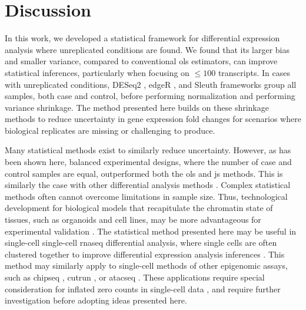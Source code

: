 \section{Discussion}

In this work, we developed a statistical framework for differential expression analysis where unreplicated conditions are found.
We found that its larger bias and smaller variance, compared to conventional \gls{ols} estimators, can improve statistical inferences, particularly when focusing on $\le 100$ transcripts.
In cases with unreplicated conditions, DESeq2 \cite{loveModeratedEstimationFold2014}, edgeR \cite{robinsonEdgeRBioconductorPackage2010}, and Sleuth \cite{pimentelDifferentialAnalysisRNAseq2017,yiGenelevelDifferentialAnalysis2018} frameworks group all samples, both case and control, before performing normalization and performing variance shrinkage.
The method presented here builds on these shrinkage methods to reduce uncertainty in gene expression fold changes for scenarios where biological replicates are missing or challenging to produce.

Many statistical methods exist to similarly reduce uncertainty.
However, as has been shown here, balanced experimental designs, where the number of case and control samples are equal, outperformed both the \gls{ols} and \gls{js} methods.
This is similarly the case with other differential analysis methods \cite{schurchHowManyBiological2016,gierlinskiStatisticalModelsRNAseq2015}.
Complex statistical methods often cannot overcome limitations in sample size.
Thus, technological development for biological models that recapitulate the chromatin state of tissues, such as organoids and cell lines, may be more advantageous for experimental validation \cite{zanoniModelingNeoplasticDisease2020}.
The statistical method presented here may be useful in single-cell single-cell \gls{rnaseq} differential analysis, where single cells are often clustered together to improve differential expression analysis inferences \cite{chenAssessmentComputationalMethods2019}.
This method may similarly apply to single-cell methods of other epigenomic assays,  such as \gls{chipseq} \cite{rotemSinglecellChIPseqReveals2015}, \gls{cutrun} \cite{hainerProfilingPluripotencyFactors2019}, or \gls{atacseq} \cite{buenrostroSinglecellChromatinAccessibility2015}.
These applications require special consideration for inflated zero counts in single-cell data \cite{chenAssessmentComputationalMethods2019}, and require further investigation before adopting ideas presented here.
